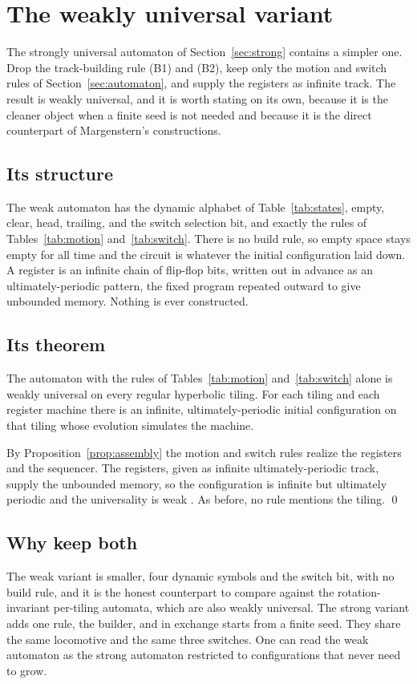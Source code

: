 \section{The weakly universal variant}
\label{sec:weak}

The strongly universal automaton of Section~\ref{sec:strong} contains a simpler one. Drop the track-building
rule (B1) and (B2), keep only the motion and switch rules of Section~\ref{sec:automaton}, and supply the
registers as infinite track. The result is weakly universal, and it is worth stating on its own, because it is
the cleaner object when a finite seed is not needed and because it is the direct counterpart of Margenstern's
constructions.

\subsection{Its structure}

The weak automaton has the dynamic alphabet of Table~\ref{tab:states}, empty, clear, head, trailing, and the
switch selection bit, and exactly the rules of Tables~\ref{tab:motion} and~\ref{tab:switch}. There is no build
rule, so empty space stays empty for all time and the circuit is whatever the initial configuration laid down.
A register is an infinite chain of flip-flop bits, written out in advance as an ultimately-periodic pattern, the
fixed program repeated outward to give unbounded memory. Nothing is ever constructed.

\subsection{Its theorem}

\begin{theorem}
\label{thm:weak}
The automaton with the rules of Tables~\ref{tab:motion} and~\ref{tab:switch} alone is weakly universal on every
regular hyperbolic tiling. For each tiling and each register machine there is an infinite, ultimately-periodic
initial configuration on that tiling whose evolution simulates the machine.
\end{theorem}

By Proposition~\ref{prop:assembly} the motion and switch rules realize the registers and the sequencer. The
registers, given as infinite ultimately-periodic track, supply the unbounded memory, so the configuration is
infinite but ultimately periodic and the universality is weak \cite{minsky1967}. As before, no rule mentions the
tiling. \qed

\subsection{Why keep both}

The weak variant is smaller, four dynamic symbols and the switch bit, with no build rule, and it is the honest
counterpart to compare against the rotation-invariant per-tiling automata, which are also weakly universal. The
strong variant adds one rule, the builder, and in exchange starts from a finite seed. They share the same
locomotive and the same three switches. One can read the weak automaton as the strong automaton restricted to
configurations that never need to grow.
